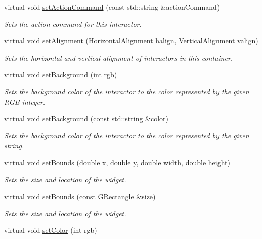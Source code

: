 \begin{DoxyCompactItemize}
virtual void \mbox{\hyperlink{classGInteractor_a4b5843fe3030e038a1ba54cc03389bcf}{set\+Action\+Command}} (const std\+::string \&action\+Command)
\begin{DoxyCompactList}\small\item\em Sets the action command for this interactor. \end{DoxyCompactList}\item 
virtual void \mbox{\hyperlink{classGContainer_a0bcf8805d87afc9bb4c6ca238ca7c0bd}{set\+Alignment}} (Horizontal\+Alignment halign, Vertical\+Alignment valign)
\begin{DoxyCompactList}\small\item\em Sets the horizontal and vertical alignment of interactors in this container. \end{DoxyCompactList}\item 
virtual void \mbox{\hyperlink{classGInteractor_acba7e546c2025c0a15ca4b4cc92043db}{set\+Background}} (int rgb)
\begin{DoxyCompactList}\small\item\em Sets the background color of the interactor to the color represented by the given R\+GB integer. \end{DoxyCompactList}\item 
virtual void \mbox{\hyperlink{classGInteractor_ab4677ab2474e68b07aa56605af92a84a}{set\+Background}} (const std\+::string \&color)
\begin{DoxyCompactList}\small\item\em Sets the background color of the interactor to the color represented by the given string. \end{DoxyCompactList}\item 
virtual void \mbox{\hyperlink{classGInteractor_a2aae8197624b72265ab83b4f1bc73f2f}{set\+Bounds}} (double x, double y, double width, double height)
\begin{DoxyCompactList}\small\item\em Sets the size and location of the widget. \end{DoxyCompactList}\item 
virtual void \mbox{\hyperlink{classGInteractor_acada386653f008cacc7cce86426bef7c}{set\+Bounds}} (const \mbox{\hyperlink{classGRectangle}{G\+Rectangle}} \&size)
\begin{DoxyCompactList}\small\item\em Sets the size and location of the widget. \end{DoxyCompactList}\item 
virtual void \mbox{\hyperlink{classGInteractor_ab1f5cc0f5cc6bbbd716a526c61f1081d}{set\+Color}} (int rgb)

\end{DoxyCompactItemize}
